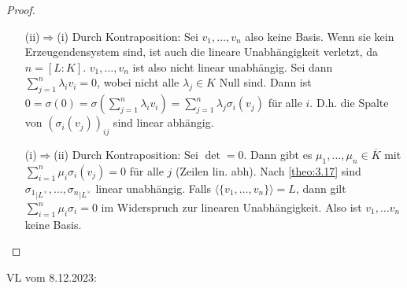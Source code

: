 \documentclass[../main.tex]{subfiles}
\begin{document}
\begin{proof}$ $
    \begin{itemize}
        \item[(ii)$\Rightarrow$(i)] Durch Kontraposition:
        Sei $v_1,\dots,v_n$ also keine Basis.
        Wenn sie kein Erzeugendensystem sind, ist auch die lineare Unabhängigkeit verletzt, da $n=[L:K]$.
        $v_1,\dots,v_n$ ist also nicht linear unabhängig.
        Sei dann $\sum_{j=1}^n \lambda_i v_i = 0$, wobei nicht alle $\lambda_j\in K$ Null sind.
        Dann ist $0= \sigma(0)= \sigma(\sum_{j=1}^n \lambda_i v_i) = \sum_{j=1}^n \lambda_j \sigma_i(v_j)$ für alle $i$.
        D.h. die Spalte von $(\sigma_i(v_j))_{ij}$ sind linear abhängig.
        \item[(i)$\Rightarrow$(ii)] Durch Kontraposition: Sei $\det = 0$. Dann gibt es $\mu_1,\dots,\mu_n\in \overline{K}$ mit $\sum_{i=1}^n\mu_i \sigma_i(v_j) = 0$ für alle $j$ (Zeilen lin. abh).
        Nach \cref{theo:3.17} sind ${\sigma_1}_{|L^\times},\dots,{\sigma_n}_{|L^\times}$ linear unabhängig.
        Falls $\langle\{v_1,\dots,v_n\}\rangle = L$, dann gilt $\sum_{i=1}^n \mu_i\sigma_i = 0$ im Widerspruch zur linearen Unabhängigkeit.
        Also ist $v_1,\dots v_n$ keine Basis.
    \end{itemize}
\end{proof}

\begin{flushright}
VL vom 8.12.2023:
\end{flushright}
\end{document}

